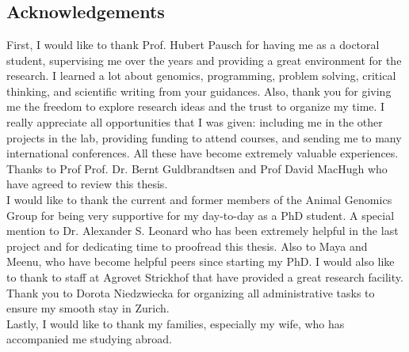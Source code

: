 \documentclass[11 pt, a4paper, notitlepage, twoside]{report}
\begin{document}
\chapter*{}
\singlespacing
{}


\thispagestyle{plain}

\section*{\LARGE{Acknowledgements}}
\bigskip

\normalsize
\onehalfspacing
First, I would like to thank Prof. Hubert Pausch for having me as a doctoral student, 
supervising me over the years and providing a great environment for the research. 
I learned a lot about genomics, programming, problem solving, critical thinking, and scientific writing from your guidances.
Also, thank you for giving me the freedom to explore research ideas and the trust to organize my time. 
I really appreciate all opportunities that I was given: including me in the other projects in the lab, providing funding to attend courses, and sending me to many international conferences. 
All these have become extremely valuable experiences. \\

Thanks to Prof Prof. Dr. Bernt Guldbrandtsen and Prof David MacHugh who have agreed to review this thesis.\\

I would like to thank the current and former members of the Animal Genomics Group for being very supportive for my day-to-day as a PhD student. 
A special mention to Dr. Alexander S. Leonard who has been extremely helpful in the last project and for dedicating time to proofread this thesis. 
Also to Maya and Meenu, who have become helpful peers since starting my PhD. 
I would also like to thank to staff at Agrovet Strickhof that have provided a great research facility. 
Thank you to Dorota Niedzwiecka for organizing all administrative tasks to ensure my smooth stay in Zurich.  \\

Lastly, I would like to thank my families, especially my wife, who has accompanied me studying abroad.  

\newpage



\newif\ifincludecv
\includecvtrue %
\ifincludecv
    \newpage
    
\fi
\end{document}
